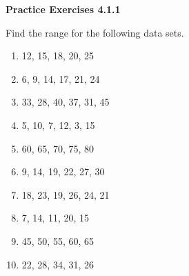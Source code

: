   \vspace{1ex}
\noindent\textbf{Practice Exercises 4.1.1}

\vspace{0.75ex}

Find the range for the following data sets.
\begin{multicols}{2}
\begin{enumerate}[noitemsep, label = \color{blue}\arabic*. ]
    \item 12, 15, 18, 20, 25
    \item 6, 9, 14, 17, 21, 24
    \item 33, 28, 40, 37, 31, 45
    \item 5, 10, 7, 12, 3, 15
    \item 60, 65, 70, 75, 80
    \item 9, 14, 19, 22, 27, 30
    \item 18, 23, 19, 26, 24, 21
    \item 7, 14, 11, 20, 15
    \item 45, 50, 55, 60, 65
    \item 22, 28, 34, 31, 26
\end{enumerate}
\end{multicols}
